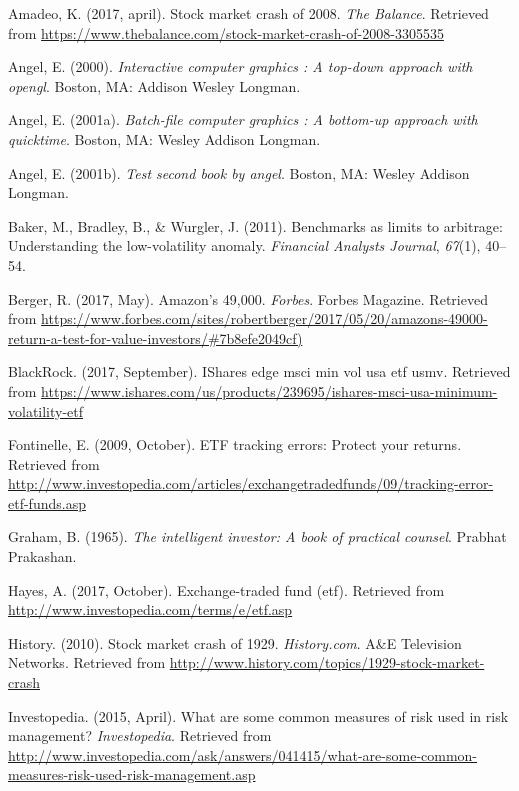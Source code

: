 \documentclass[12pt,twoside]{reedthesis}
\theoremstyle{definition}
\theoremstyle{definition}
\theoremstyle{definition}
\theoremstyle{remark}
\begin{document}
\hypertarget{refs}{}
\hypertarget{ref-amadeo2017}{}
Amadeo, K. (2017, april). Stock market crash of 2008. \emph{The
Balance}. Retrieved from
\url{https://www.thebalance.com/stock-market-crash-of-2008-3305535}

\hypertarget{ref-angel2000}{}
Angel, E. (2000). \emph{Interactive computer graphics : A top-down
approach with opengl}. Boston, MA: Addison Wesley Longman.

\hypertarget{ref-angel2001}{}
Angel, E. (2001a). \emph{Batch-file computer graphics : A bottom-up
approach with quicktime}. Boston, MA: Wesley Addison Longman.

\hypertarget{ref-angel2002a}{}
Angel, E. (2001b). \emph{Test second book by angel}. Boston, MA: Wesley
Addison Longman.

\hypertarget{ref-baker2011}{}
Baker, M., Bradley, B., \& Wurgler, J. (2011). Benchmarks as limits to
arbitrage: Understanding the low-volatility anomaly. \emph{Financial
Analysts Journal}, \emph{67}(1), 40--54.

\hypertarget{ref-berger2017}{}
Berger, R. (2017, May). Amazon's 49,000. \emph{Forbes}. Forbes Magazine.
Retrieved from
\url{https://www.forbes.com/sites/robertberger/2017/05/20/amazons-49000-return-a-test-for-value-investors/\#7b8efe2049cf)}

\hypertarget{ref-blackrock2017}{}
BlackRock. (2017, September). IShares edge msci min vol usa etf
\textbar{} usmv. Retrieved from
\url{https://www.ishares.com/us/products/239695/ishares-msci-usa-minimum-volatility-etf}

\hypertarget{ref-fontinelle2009}{}
Fontinelle, E. (2009, October). ETF tracking errors: Protect your
returns. Retrieved from
\url{http://www.investopedia.com/articles/exchangetradedfunds/09/tracking-error-etf-funds.asp}

\hypertarget{ref-graham1965}{}
Graham, B. (1965). \emph{The intelligent investor: A book of practical
counsel}. Prabhat Prakashan.

\hypertarget{ref-hayes2017}{}
Hayes, A. (2017, October). Exchange-traded fund (etf). Retrieved from
\url{http://www.investopedia.com/terms/e/etf.asp}

\hypertarget{ref-history2010}{}
History. (2010). Stock market crash of 1929. \emph{History.com}. A\&E
Television Networks. Retrieved from
\url{http://www.history.com/topics/1929-stock-market-crash}

\hypertarget{ref-investopedia2015}{}
Investopedia. (2015, April). What are some common measures of risk used
in risk management? \emph{Investopedia}. Retrieved from
\url{http://www.investopedia.com/ask/answers/041415/what-are-some-common-measures-risk-used-risk-management.asp}
\end{document}
